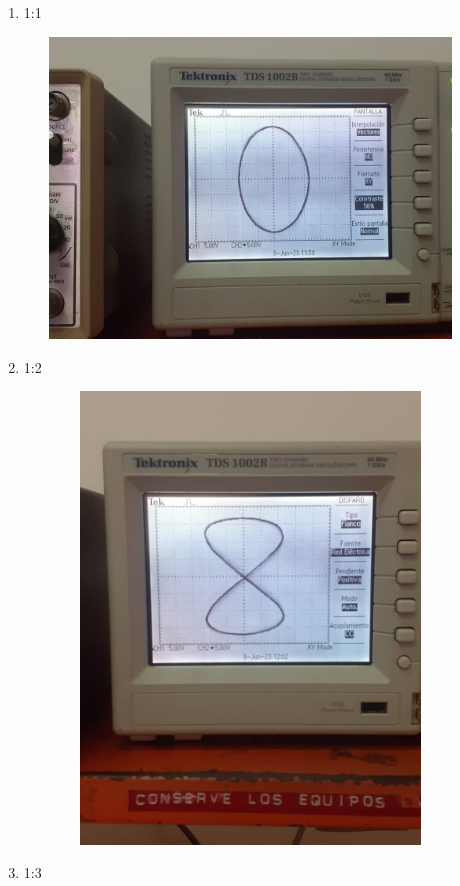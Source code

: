 \documentclass[12pt]{article}
\begin{document}
	\begin{enumerate}
		\item 1:1
		
		\begin{center}
			\includegraphics[width=12cm,height=8cm]{Img/l1}
		\end{center}
		
		\item 1:2
		
		\begin{center}
			\includegraphics[width=12cm,height=12cm]{Img/l2}
		\end{center}
		
		\item 1:3
		

\end{enumerate}
\end{document}
